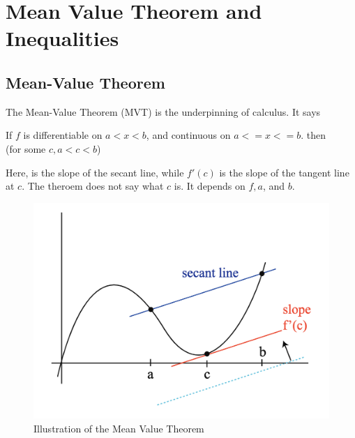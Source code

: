 

\chapter{Mean Value Theorem and Inequalities}

\bigbreak

\section{Mean-Value Theorem}

The Mean-Value Theorem (MVT) is the underpinning of calculus. It says
\begin{mdframed}[]
\begin{center}
    If $f$ is differentiable on $a < x < b$, and continuous on $a <= x <= b$. then \\
     (for some $c, a < c < b$)
\end{center}
\end{mdframed}

Here,  is the slope of the secant line, while $f'(c)$ is the slope of the tangent line at $c$.
The theroem does not say what $c$ is. It depends on $f, a$, and $b$.

\begin{figure}[ht!]
	\centering
	\includegraphics[scale=0.7]{./images/lecture_9_figure_1.png}
	\caption{Illustration of the Mean Value Theorem}
\end{figure}

